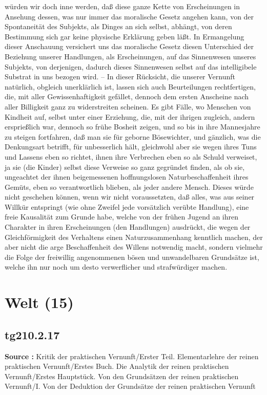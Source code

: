\documentclass[a4paper,12pt,twoside]{book}
\newcommand{\unnumberedsection}[1]{
	\section*{#1}
	\addcontentsline{toc}{section}{#1}
	\markright{#1}
}
\begin{document}
würden wir doch inne werden, daß diese ganze Kette von Erscheinungen in Ansehung dessen, was nur immer das moralische Gesetz angehen kann, von der Spontaneität des Subjekts, als Dinges an sich selbst, abhängt, von deren Bestimmung sich gar keine physische Erklärung geben läßt. In Ermangelung dieser Anschauung versichert uns das moralische Gesetz diesen Unterschied der Beziehung unserer Handlungen, als Erscheinungen, auf das Sinnenwesen unseres Subjekts, von derjenigen, dadurch dieses Sinnenwesen selbst auf das intelligibele Substrat in uns bezogen wird. – In dieser Rücksicht, die unserer Vernunft natürlich, obgleich unerklärlich ist, lassen sich auch Beurteilungen rechtfertigen, die, mit aller Gewissenhaftigkeit gefället, dennoch dem ersten Anscheine nach aller Billigkeit ganz zu widerstreiten scheinen. Es gibt Fälle, wo Menschen von Kindheit auf, selbst unter einer Erziehung, die, mit der ihrigen zugleich, andern ersprießlich war, dennoch so frühe Bosheit zeigen, und so bis in ihre Mannesjahre zu steigen fortfahren, daß man sie für geborne Bösewichter, und gänzlich, was die Denkungsart betrifft, für unbesserlich hält, gleichwohl aber sie wegen ihres Tuns und Lassens eben so richtet, ihnen ihre Verbrechen eben so als Schuld verweiset, ja sie (die Kinder) selbst diese Verweise so ganz gegründet  finden, als ob sie, ungeachtet der ihnen beigemessenen hoffnungslosen Naturbeschaffenheit ihres Gemüts, eben so verantwortlich blieben, als jeder andere Mensch. Dieses würde nicht geschehen können, wenn wir nicht voraussetzten, daß alles, was aus seiner Willkür entspringt (wie ohne Zweifel jede vorsätzlich verübte Handlung), eine freie Kausalität zum Grunde habe, welche von der frühen Jugend an ihren Charakter in ihren Erscheinungen (den Handlungen) ausdrückt, die wegen der Gleichförmigkeit des Verhaltens einen Naturzusammenhang kenntlich machen, der aber nicht die arge Beschaffenheit des Willens notwendig macht, sondern vielmehr die Folge der freiwillig angenommenen bösen und unwandelbaren Grundsätze ist, welche ihn nur noch um desto verwerflicher und strafwürdiger machen. 
	
	\unnumberedsection{Welt (15)} 
	\subsection*{tg210.2.17} 
	\textbf{Source : }Kritik der praktischen Vernunft/Erster Teil. Elementarlehre der reinen praktischen Vernunft/Erstes Buch. Die Analytik der reinen praktischen Vernunft/Erstes Hauptstück. Von den Grundsätzen der reinen praktischen Vernunft/I. Von der Deduktion der Grundsätze der reinen praktischen Vernunft\\  
	
\end{document}
